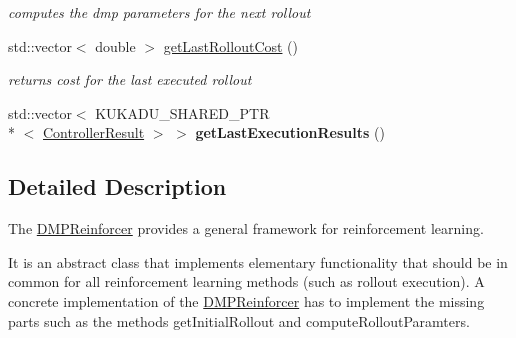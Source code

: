 \begin{DoxyCompactItemize}
\begin{DoxyCompactList}\small\item\em computes the dmp parameters for the next rollout \end{DoxyCompactList}\item 
\hypertarget{classkukadu_1_1DMPReinforcer_ae1e7b4f023979e5076897102a54066c3}{std\-::vector$<$ double $>$ \hyperlink{classkukadu_1_1DMPReinforcer_ae1e7b4f023979e5076897102a54066c3}{get\-Last\-Rollout\-Cost} ()}\label{classkukadu_1_1DMPReinforcer_ae1e7b4f023979e5076897102a54066c3}

\begin{DoxyCompactList}\small\item\em returns cost for the last executed rollout \end{DoxyCompactList}\item 
\hypertarget{classkukadu_1_1DMPReinforcer_a53f28e972c75ec336d55aee227ba5b30}{std\-::vector$<$ K\-U\-K\-A\-D\-U\-\_\-\-S\-H\-A\-R\-E\-D\-\_\-\-P\-T\-R\\*
$<$ \hyperlink{classkukadu_1_1ControllerResult}{Controller\-Result} $>$ $>$ {\bfseries get\-Last\-Execution\-Results} ()}\label{classkukadu_1_1DMPReinforcer_a53f28e972c75ec336d55aee227ba5b30}

\end{DoxyCompactItemize}


\subsection{Detailed Description}
The \hyperlink{classkukadu_1_1DMPReinforcer}{D\-M\-P\-Reinforcer} provides a general framework for reinforcement learning. 

It is an abstract class that implements elementary functionality that should be in common for all reinforcement learning methods (such as rollout execution). A concrete implementation of the \hyperlink{classkukadu_1_1DMPReinforcer}{D\-M\-P\-Reinforcer} has to implement the missing parts such as the methods get\-Initial\-Rollout and compute\-Rollout\-Paramters. 

